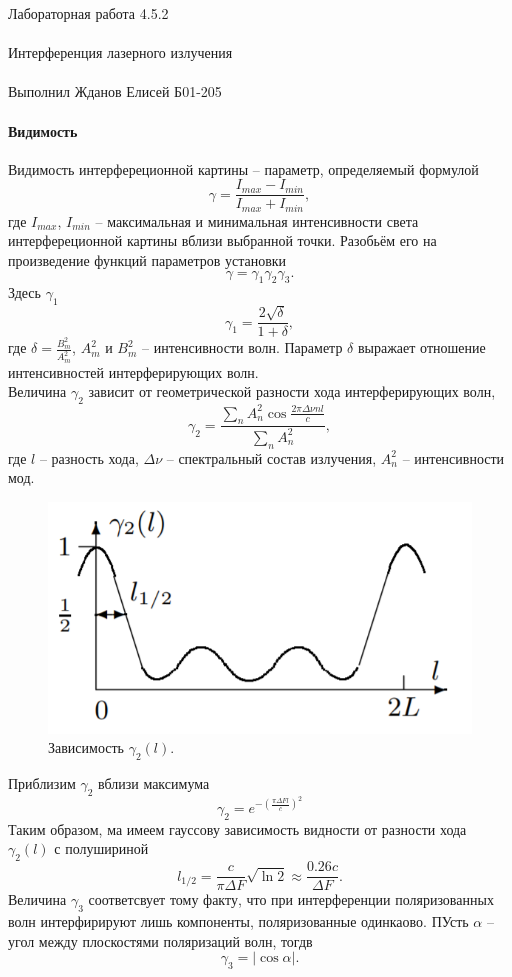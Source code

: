 \documentclass{astroedu-lab}
\begin{document}
\begin{problem}{\huge Лабораторная работа 4.5.2\\\\Интерференция лазерного излучения\\\\Выполнил Жданов Елисей Б01-205}
\paragraph*{Видимость}
Видимость интерфереционной картины -- параметр, определяемый формулой
\begin{equation}
\gamma = \dfrac{I_{max} - I_{min}}{I_{max} + I_{min}},
\end{equation}
где $I_{max}$, $I_{min}$ -- максимальная и минимальная интенсивности света интерфереционной картины вблизи выбранной точки. Разобьём его на произведение функций параметров установки
$$
\gamma = \gamma_1 \gamma_2 \gamma_3.
$$
Здесь $\gamma_1$
\begin{equation}
\gamma_1 = \dfrac{2\sqrt{\delta}}{1+\delta},
\end{equation}
где $\delta = \frac{B_m^2}{A_m^2}$, $A_m^2$ и $B_m^2$ -- интенсивности волн. Параметр $\delta$ выражает отношение интенсивностей интерферирующих волн.\\
Величина $\gamma_2$ зависит от геометрической разности хода интерферирующих волн,
$$
\gamma_2 = \dfrac{\sum\limits_n A^2_n \cos \frac{2\pi \Delta \nu n l}{c}}{\sum\limits_n A_n^2},
$$
где $l$ -- разность хода, $\Delta \nu$ -- спектральный состав излучения, $A_n^2$ -- интенсивности мод. 
\begin{figure}[H]
\begin{center}
\includegraphics[scale=0.6]{1.png}
\end{center}
\caption{Зависимость $\gamma_2(l)$.}
\end{figure}
\noindent Приблизим $\gamma_2$ вблизи максимума
$$
\gamma_2 = e^{-\left(\frac{\pi \Delta F l}{c}\right)^2}
$$
Таким образом, ма имеем гауссову зависимость видности от разности хода $\gamma_2(l)$ с полушириной 
\begin{equation}
l_{1/2} = \dfrac{c}{\pi \Delta F}\sqrt{\ln 2} \approx \dfrac{0.26 c}{\Delta F}.
\end{equation}
Величина $\gamma_3$ соответсвует тому факту, что при интерференции поляризованных волн интерфирируют лишь компоненты, поляризованные одинкаово. ПУсть $\alpha$ -- угол между плоскостями поляризаций волн, тогдв
\begin{equation}
\gamma_3 = |\cos \alpha|.
\end{equation}


\end{problem}
\end{document}
